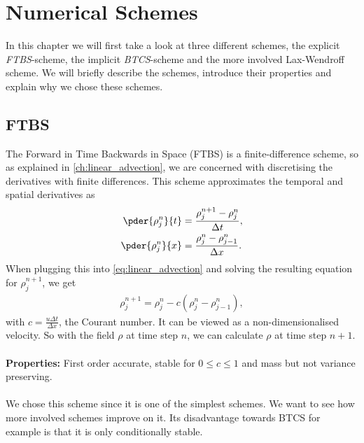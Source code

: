 \section{Numerical Schemes}
In this chapter we will first take a look at three different schemes, the explicit \textit{FTBS}-scheme, the implicit \textit{BTCS}-scheme and the more involved Lax-Wendroff scheme. We will briefly describe the schemes, introduce their properties and explain why we chose these schemes. 
\subsection{FTBS}
The Forward in Time Backwards in Space (FTBS) is a finite-difference scheme, so as explained in \cref{ch:linear_advection}, we are concerned with discretising the derivatives with finite differences. This scheme approximates the temporal and spatial derivatives as
\begin{align}
\pder{\rho^n_j}{t}&=\frac{\rho_j^{n+1}-\rho_j^{n}}{\Delta t},\\
\pder{\rho^n_j}{x}&=\frac{\rho_{j}^{n}-\rho_{j-1}^n}{\Delta x}.
\end{align}
When plugging this into \cref{eq:linear_advection} and solving the resulting equation for $\rho^{n+1}_j$, we get
\begin{align}					
\rho^{n+1}_j = \rho_j^{n}-c\left(\rho^n_{j}-\rho_{j-1}^n\right),
\end{align}
with $c=\frac{u\Delta t}{\Delta x}$, the Courant number. It can be viewed as a non-dimensionalised velocity. So with the field $\rho$ at time step $n$, we can calculate $\rho$ at time step $n+1$.\\ \\
\textbf{Properties:} First order accurate,  stable for $0\leq c \leq 1$ and mass but not variance preserving. \cite[p. 26,55,57,58]{lec} \\ \\
We chose this scheme since it is one of the simplest schemes. We want to see how more involved schemes improve on it.  Its disadvantage towards BTCS for example is that it is only conditionally stable.
